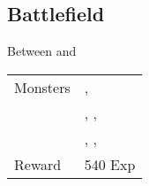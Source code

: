 \subsection{Battlefield}
\label{map:battlefield_07}

Between  and 

\noindent\begin{tabularx}{\textwidth}[l]{lX}
	Monsters
	& \nameref{monster:mage}, \nameref{monster:mage} \\
	& \nameref{monster:lamia}, \nameref{monster:lamia}, \nameref{monster:desert_hag} \\
	& \nameref{monster:lamia}, \nameref{monster:lamia}, \nameref{monster:lamia}
\\ \hline
	Reward & 540 Exp
\end{tabularx}
